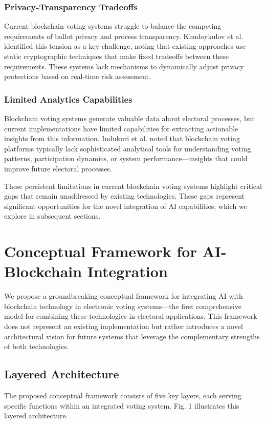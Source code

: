 \documentclass[conference]{IEEEtran}
\begin{document}
\subsubsection{Privacy-Transparency Tradeoffs}
Current blockchain voting systems struggle to balance the competing requirements of ballot privacy and process transparency. Khudoykulov et al. \cite{b1} identified this tension as a key challenge, noting that existing approaches use static cryptographic techniques that make fixed tradeoffs between these requirements. These systems lack mechanisms to dynamically adjust privacy protections based on real-time risk assessment.

\subsubsection{Limited Analytics Capabilities}
Blockchain voting systems generate valuable data about electoral processes, but current implementations have limited capabilities for extracting actionable insights from this information. Indukuri et al. \cite{b8} noted that blockchain voting platforms typically lack sophisticated analytical tools for understanding voting patterns, participation dynamics, or system performance—insights that could improve future electoral processes.

These persistent limitations in current blockchain voting systems highlight critical gaps that remain unaddressed by existing technologies. These gaps represent significant opportunities for the novel integration of AI capabilities, which we explore in subsequent sections.

\section{Conceptual Framework for AI-Blockchain Integration}
We propose a groundbreaking conceptual framework for integrating AI with blockchain technology in electronic voting systems—the first comprehensive model for combining these technologies in electoral applications. This framework does not represent an existing implementation but rather introduces a novel architectural vision for future systems that leverage the complementary strengths of both technologies.

\subsection{Layered Architecture}
The proposed conceptual framework consists of five key layers, each serving specific functions within an integrated voting system. Fig. 1 illustrates this layered architecture.
\end{document}
